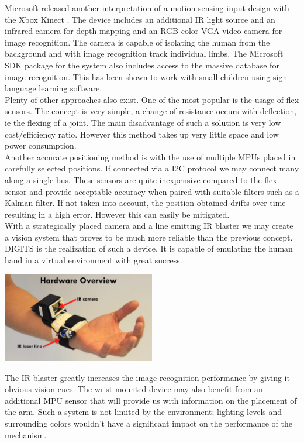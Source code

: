 \documentclass{article}
\begin{document}
\indent Microsoft released another interpretation of a motion sensing input design with the Xbox Kinect \cite{kinect}. The device includes an additional IR light source and an infrared camera for depth mapping and an RGB color VGA video camera for image recognition. The camera is capable of isolating the human from the background and with image recognition track individual limbs. The Microsoft SDK package for the system also includes access to the massive database for image recognition. This has been shown to work with small children using sign language learning software.\\[12pt]
\indent Plenty of other approaches also exist. One of the most popular is the usage of flex sensors. The concept is very simple, a change of resistance occurs with deflection, ie the flexing of a joint. The main disadvantage of such a solution is very low cost/efficiency ratio. However this method takes up very little space and low power consumption.\\[12pt] 
\indent Another accurate positioning method is with the use of multiple MPUs placed in carefully selected positions. If connected via a I2C protocol we may connect many along a single bus. These sensors are quite inexpensive compared to the flex sensor and provide acceptable accuracy when paired with suitable filters such as a Kalman filter. If not taken into account, the position obtained drifts over time resulting in a high error. However this can easily be mitigated.\\[12pt] 
\indent With a strategically placed camera and a line emitting IR blaster we may create a vision system that proves to be much more reliable than the previous concept. DIGITS \cite{Digits} is the realization of such a device. It is capable of emulating the human hand in a virtual environment with great success.

\begin{center}
\includegraphics[width=0.5\textwidth]{IMG/HandSens02.png}
\end{center}

\indent The IR blaster greatly increases the image recognition performance by giving it obvious vision cues. The wrist mounted device may also benefit from an additional MPU sensor that will provide us with information on the placement of the arm. Such a system is not limited by the environment; lighting levels and surrounding colors wouldn't have a significant impact on the performance of the mechanism.
\end{document}
